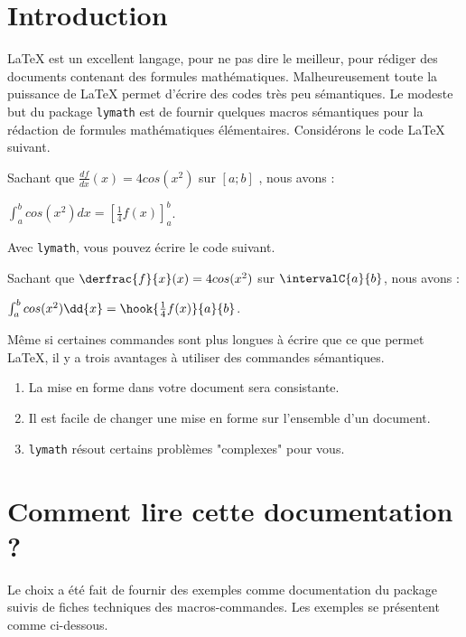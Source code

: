 \documentclass[12pt,a4paper]{article}
\begin{document}
\section{Introduction}

\LaTeX{} est un excellent langage, pour ne pas dire le meilleur, pour rédiger des documents contenant des formules mathématiques.
Malheureusement toute la puissance de \LaTeX{} permet d'écrire des codes très peu sémantiques.
Le modeste but du package \verb+lymath+ est de fournir quelques macros sémantiques pour la rédaction de formules mathématiques élémentaires. Considérons le code \LaTeX{} suivant.

\begin{latexex-alone}
Sachant que $\frac{df}{dx}(x) = 4 cos(x^2)$ sur $[a ; b]$ , nous avons :

$\int_a^b cos(x^2) dx = \left[ \frac{1}{4} f(x) \right]_a^b$.
\end{latexex-alone}


Avec \verb+lymath+, vous pouvez écrire le code suivant.

\begin{latexex-alone}
Sachant que $\derfrac{f}{x}(x) = 4 cos(x^2)$ sur $\intervalC{a}{b}$, nous avons :

$\int_a^b cos(x^2) \dd{x} = \hook{\frac{1}{4} f(x)}{a}{b}$.
\end{latexex-alone}


Même si certaines commandes sont plus longues à écrire que ce que permet \LaTeX{}, il y a trois avantages à utiliser des commandes sémantiques.
\begin{enumerate}
	\item La mise en forme dans votre document sera consistante.

	\item Il est facile de changer une mise en forme sur l'ensemble d'un document.

	\item \verb+lymath+ résout certains problèmes "complexes" pour vous.
\end{enumerate}




\section{Comment lire cette documentation ?}

Le choix a été fait de fournir des exemples comme documentation du package suivis de fiches techniques des macros-commandes. Les exemples se présentent comme ci-dessous.
\end{document}

